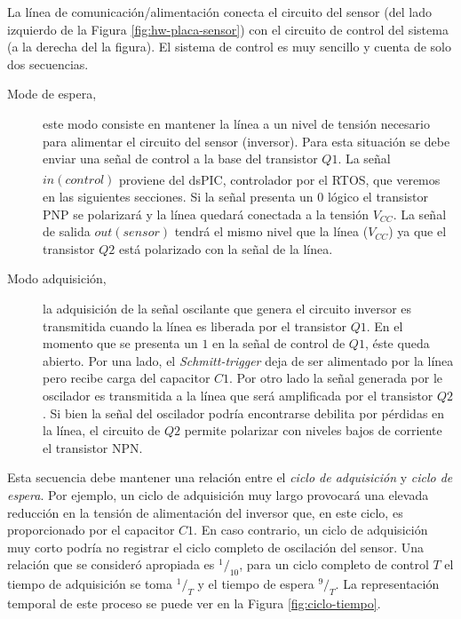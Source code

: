 \documentclass[11pt,a4paper,oneside]{article}
\begin{document}
La línea de comunicación/alimentación conecta el circuito del sensor (del lado izquierdo de la Figura \ref{fig:hw-placa-sensor}) con el circuito de control del sistema (a la derecha del la figura). El sistema de control es muy sencillo y cuenta de solo dos secuencias. 
\begin{description}

\item[Mode de espera,]  este modo consiste en mantener la línea a un nivel de tensión necesario para alimentar el circuito del sensor (inversor). Para esta situación se debe enviar una señal de control a la base del transistor $Q1$. La señal $in (control)$ proviene del dsPIC\textsuperscript{\textregistered}, controlador por el RTOS, que veremos en las siguientes secciones. Si la señal presenta un $0$ lógico el transistor PNP se polarizará y la línea quedará conectada a la tensión $V_{CC}$. La señal de salida $out (sensor)$ tendrá el mismo nivel que la línea ($V_{CC}$) ya que el transistor $Q2$ está polarizado con la señal de la línea. 

\item[Modo adquisición,] la adquisición de la señal oscilante que genera el circuito inversor es transmitida cuando la línea es liberada por el transistor $Q1$. En el momento que se presenta un $1$ en la señal de control de $Q1$, éste queda abierto. Por una lado, el \textsl{Schmitt-trigger} deja de ser alimentado por la línea pero recibe carga del capacitor $C1$. Por otro lado la señal generada por le oscilador es transmitida a la línea que será amplificada por el transistor $Q2$. Si bien la señal del oscilador podría encontrarse debilita por pérdidas en la línea, el circuito de $Q2$ permite polarizar con niveles bajos de corriente el transistor NPN.

\end{description}

Esta secuencia debe mantener una relación entre el \emph{ciclo de adquisición} y \emph{ciclo de espera}. Por ejemplo, un ciclo de adquisición muy largo provocará una elevada reducción en la tensión de alimentación del inversor que, en este ciclo, es proporcionado por el capacitor $C1$. En caso contrario, un ciclo de adquisición muy corto podría no registrar el ciclo completo de oscilación del sensor. Una relación que se consideró apropiada es $^1/_{10}$, para un ciclo completo de control $T$ el tiempo de adquisición se toma $^1/_T$ y el tiempo de espera $^9/_T$. La representación temporal de este proceso se puede ver en la Figura \ref{fig:ciclo-tiempo}.
\end{document}
